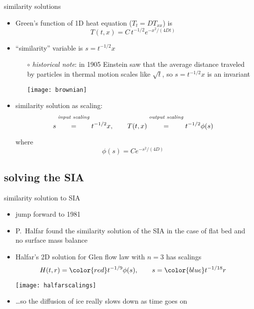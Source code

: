 \begin{frame}{similarity solutions}

\begin{itemize}
\item Green's function of 1D heat equation ($T_t = D T_{xx}$) is
	$$T(t,x) = C\, t^{-1/2} e^{-x^2/(4Dt)}$$
\item ``similarity'' variable is $s = t^{-1/2} x$
  \begin{itemize}
  \item[$\circ$] \emph{historical note}:  in 1905 Einstein saw that the average distance traveled by particles in thermal motion scales like $\sqrt{t}$, so $s = t^{-1/2} x$ is an invariant

  \vspace{-2mm}
  \hfill\texttt{[image: brownian]}
  \end{itemize}
\item similarity solution as scaling:
	$$s \stackrel{\text{\emph{input scaling}}}{\phantom{\Big|}=\phantom{\Big|}} t^{-1/2} x, \qquad T(t,x) \stackrel{\text{\emph{output scaling}}}{\phantom{\Big|}=\phantom{\Big|}} t^{-1/2} \phi(s)$$
where
    $$\phi(s) = C e^{-s^2/(4D)}$$
\end{itemize}

\end{frame}


\subsection{solving the SIA}

\begin{frame}{similarity solution to SIA}

\begin{itemize}
\item jump forward to 1981
\item P.~Halfar found the similarity solution of the SIA in the case of flat bed and no surface mass balance \nocite{Halfar81,Halfar83}
\item Halfar's 2D solution for Glen flow law with $n=3$ has scalings
   $$H(t,r)={\color{red} t^{-1/9}} \phi(s), \qquad s = {\color{blue} t^{-1/18}} r$$
  \begin{center}
  \texttt{[image: halfarscalings]}
  \end{center}
\item \dots so the diffusion of ice really slows down as time goes on
\end{itemize}
\end{frame}


